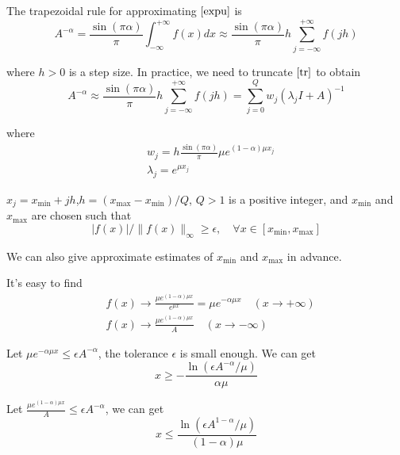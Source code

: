 The trapezoidal rule for approximating $\eqref{expu}$ is
\begin{equation}
{A}^{-\alpha}=\frac{\sin(\pi \alpha)}{\pi}\int_{-\infty}^{+\infty}f(x)dx\approx \frac{\sin(\pi \alpha)}{\pi} h \sum_{j=-\infty}^{+\infty} f(jh)
\label{tr}
\end{equation}

where $h>0$ is a step size. In practice, we need to truncate $\eqref{tr}$ to obtain
\begin{equation}
{A}^{-\alpha}\approx \frac{\sin(\pi \alpha)}{\pi} h\sum_{j=-\infty}^{+\infty} f(jh)
=\sum_{j=0}^{Q}w_j(\lambda_jI+A)^{-1}
\label{SE}
\end{equation}

where
\begin{equation}
     \begin{aligned}
&w_j=h\frac{\sin(\pi \alpha)}{\pi}\mu e^{(1-\alpha)\mu x_j}\\
&\lambda_j=e^{\mu x_j}
    \end{aligned}
\end{equation}

$x_j=x_{\min}+jh$,$h=(x_{\max}-x_{\min})/Q$, $Q>1$ is a positive integer, and $x_{\min}$ and $x_{\max}$ are chosen such that
\begin{equation}
|f(x)|/\|f(x)\|_{\infty}\ge \epsilon ,\quad \forall x\in[x_{\min},x_{\max}]
\label{findMN}
\end{equation}

We can also give approximate estimates of $x_{\min}$ and $x_{\max}$ in advance.

It's easy to find
\begin{equation}
\begin{aligned}
& f(x)\rightarrow \frac{\mu e^{(1-\alpha)\mu x}}{e^{\mu x}}=\mu e^{-\alpha \mu x} \quad (x \rightarrow +\infty)\\
& f(x)\rightarrow \frac{\mu e^{(1-\alpha)\mu x}}{A} \quad (x \rightarrow -\infty)
\end{aligned}
\label{AS_SE}
\end{equation}

Let $\mu e^{-\alpha \mu x}\leq \epsilon A^{-\alpha}$, the tolerance $\epsilon$ is small enough. We can get
\begin{equation}
x\geq -\frac{\ln(\epsilon A^{-\alpha}/\mu)}{\alpha \mu}
\end{equation}

Let $\frac{\mu e^{(1-\alpha)\mu x}}{A} \leq \epsilon A^{-\alpha}$, we can get
\begin{equation}
x\leq \frac{\ln(\epsilon A^{1-\alpha}/\mu)}{(1-\alpha)\mu}
\end{equation}

